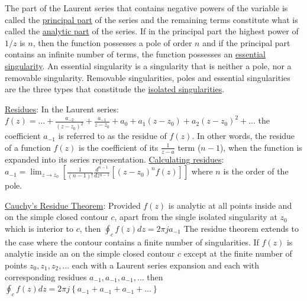 \documentclass[12pt]{article}
\begin{document}
\begin{flushleft}
	\textbullet \quad The part of the Laurent series that contains negative powers of the variable is called the \uline{principal part} of the series and the remaining terms constitute what is called the \uline{analytic part} of the series. If in the principal part the highest power of $1/z$ is $n$, then the function possesses a pole of order $n$ and if the principal part contains an infinite number of terms, the function possesses an \uline{essential singularity}. An essential singularity is a singularity that is neither a pole, nor a removable singularity. \linebreak 
	\textbullet \quad Removable singularities, poles and essential singularities are the three types that constitude the \uline{isolated singularities}. \linebreak 
	
	\textbullet \quad \uline{Residues}: In the Laurent series: $\displaystyle f(z) = \ldots + \frac{a_{-2}}{(z-z_0)^2} + \frac{a_{-1}}{z-z_0} + a_0 + a_1 (z-z_0) + a_2 (z-z_0)^2 + \ldots $ \linebreak 
	the coefficient $a_{-1}$ is referred to as the residue of $f(z)$. In other words, the residue of a function $f(z)$ is the coefficient of its $\displaystyle \frac{1}{z-a}$ term ($n-1$), when the function is expanded into its series representation. \linebreak 
	\textbullet \quad \uline{Calculating residues}: $\displaystyle a_{-1} = \lim_{z\to z_0} \left[ \frac{1}{(n-1)!} \frac{d^{n-1}}{dz^{n-1}} \left[ (z-z_0)^n f(z) \right] \right]$ \linebreak 
	where $n$ is the order of the pole. \linebreak 
	
	\textbullet \quad \uline{Cauchy's Residue Theorem}: Provided $f(z)$ is analytic at all points inside and on the simple closed contour $c$, apart from the single isolated singularity at $z_0$ which is interior to $c$, then $\displaystyle \oint_c f(z) dz = 2\pi ja_{-1}$ \linebreak 
	The residue theorem extends to the case where the contour contains a finite number of singularities. If $f(z)$ is analytic inside an on the simple closed contour $c$ except at the finite number of points $z_0, z_1, z_2, \ldots$ each with a Laurent series expansion and each with corresponding residues $ a_{-1}, a_{-1}, a_{-1}, \ldots $ then $\displaystyle \oint_c f(z) dz = 2\pi j \left\{ a_{-1} + a_{-1} + a_{-1} + \ldots \right\} $ \linebreak 
	

\end{flushleft}
\end{document}
